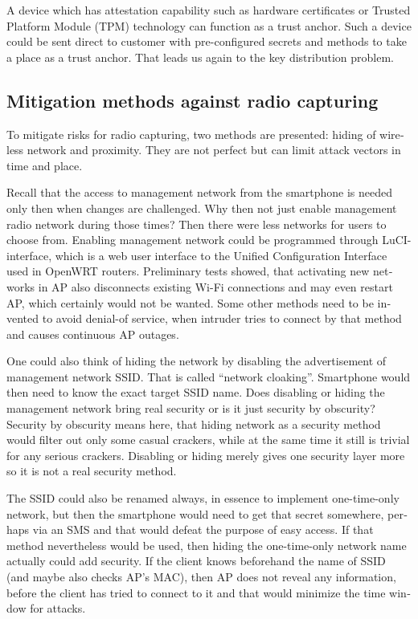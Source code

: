 \documentclass[12pt,a4paper,english]{tutthesis}
\begin{document}
\begin{otherlanguage}{english}
A device which has attestation capability such as 
hardware certificates or Trusted Platform Module (TPM) technology
can function as a trust anchor.
Such a device could be sent direct to customer with pre-configured
secrets and methods to take a place as a trust anchor. 
That leads us again to the key distribution problem.


\subsection{Mitigation methods against radio capturing}
\label{sec-6-4-7}
To mitigate risks for radio capturing, two methods are presented: hiding of
wireless network and proximity. They are not perfect but can
limit attack vectors in time and place.


Recall that the access to management network from the smartphone is
 needed only then when changes
are challenged. Why then not just enable management radio network
during those times? Then there were less networks for users to choose from.
Enabling management network could be programmed through 
LuCI-interface, which is a web user interface to the Unified
 Configuration Interface used in OpenWRT routers.
Preliminary tests showed, that activating new networks in AP also 
disconnects existing Wi-Fi connections and may even restart AP,
which certainly would not be wanted. Some other methods need to
be invented to avoid denial-of service, when intruder tries to 
connect by that method and causes continuous AP outages.

\label{tag:hidessid}
One could also think of hiding the network by disabling the
advertisement of management network SSID. That is called ``network
cloaking''.  Smartphone would then need to know the exact target SSID name.
Does disabling or hiding the management network bring real security or
is it just security by obscurity?  Security by obscurity means here,
that hiding network 
as a security method would filter out only some casual crackers, while
at the same time it still is trivial for any serious crackers.
Disabling or hiding  merely gives one security layer more so it is not
a real security method.

The SSID could also be renamed always, in essence to implement
one-time-only network, but then the smartphone would need to get that
secret somewhere, perhaps via an SMS and that would defeat the purpose
of easy access.  If that method nevertheless would be used, then
hiding the one-time-only network name actually could add security. 
If the client knows beforehand the name of SSID
(and maybe also checks AP's MAC), then AP does not reveal any information,
before the client has tried to connect to it and that would minimize
the time window for attacks.





\end{otherlanguage}
\end{document}
